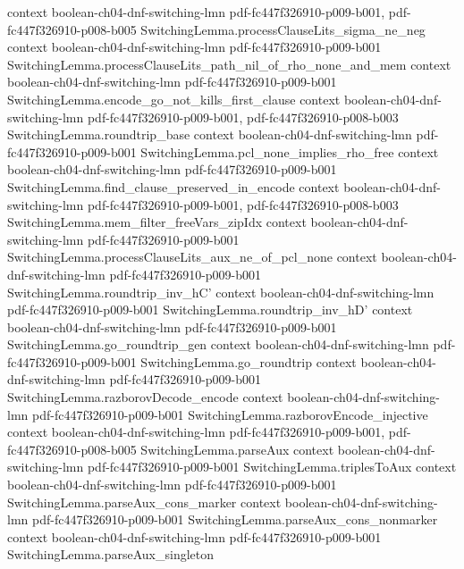 \begin{theorem}
  {context}
  {boolean-ch04-dnf-switching-lmn}
  {pdf-fc447f326910-p009-b001,
    pdf-fc447f326910-p008-b005}
\proofstep
  {SwitchingLemma.processClauseLits_sigma_ne_neg}
  {context}
  {boolean-ch04-dnf-switching-lmn}
  {pdf-fc447f326910-p009-b001}
\proofstep
  {SwitchingLemma.processClauseLits_path_nil_of_rho_none_and_mem}
  {context}
  {boolean-ch04-dnf-switching-lmn}
  {pdf-fc447f326910-p009-b001}
\proofstep
  {SwitchingLemma.encode_go_not_kills_first_clause}
  {context}
  {boolean-ch04-dnf-switching-lmn}
  {pdf-fc447f326910-p009-b001,
    pdf-fc447f326910-p008-b003}
\proofstep
  {SwitchingLemma.roundtrip_base}
  {context}
  {boolean-ch04-dnf-switching-lmn}
  {pdf-fc447f326910-p009-b001}
\proofstep
  {SwitchingLemma.pcl_none_implies_rho_free}
  {context}
  {boolean-ch04-dnf-switching-lmn}
  {pdf-fc447f326910-p009-b001}
\proofstep
  {SwitchingLemma.find_clause_preserved_in_encode}
  {context}
  {boolean-ch04-dnf-switching-lmn}
  {pdf-fc447f326910-p009-b001,
    pdf-fc447f326910-p008-b003}
\proofstep
  {SwitchingLemma.mem_filter_freeVars_zipIdx}
  {context}
  {boolean-ch04-dnf-switching-lmn}
  {pdf-fc447f326910-p009-b001}
\proofstep
  {SwitchingLemma.processClauseLits_aux_ne_of_pcl_none}
  {context}
  {boolean-ch04-dnf-switching-lmn}
  {pdf-fc447f326910-p009-b001}
\proofstep
  {SwitchingLemma.roundtrip_inv_hC'}
  {context}
  {boolean-ch04-dnf-switching-lmn}
  {pdf-fc447f326910-p009-b001}
\proofstep
  {SwitchingLemma.roundtrip_inv_hD'}
  {context}
  {boolean-ch04-dnf-switching-lmn}
  {pdf-fc447f326910-p009-b001}
\proofstep
  {SwitchingLemma.go_roundtrip_gen}
  {context}
  {boolean-ch04-dnf-switching-lmn}
  {pdf-fc447f326910-p009-b001}
\proofstep
  {SwitchingLemma.go_roundtrip}
  {context}
  {boolean-ch04-dnf-switching-lmn}
  {pdf-fc447f326910-p009-b001}
\proofstep
  {SwitchingLemma.razborovDecode_encode}
  {context}
  {boolean-ch04-dnf-switching-lmn}
  {pdf-fc447f326910-p009-b001}
\proofstep
  {SwitchingLemma.razborovEncode_injective}
  {context}
  {boolean-ch04-dnf-switching-lmn}
  {pdf-fc447f326910-p009-b001,
    pdf-fc447f326910-p008-b005}
\proofstep
  {SwitchingLemma.parseAux}
  {context}
  {boolean-ch04-dnf-switching-lmn}
  {pdf-fc447f326910-p009-b001}
\proofstep
  {SwitchingLemma.triplesToAux}
  {context}
  {boolean-ch04-dnf-switching-lmn}
  {pdf-fc447f326910-p009-b001}
\proofstep
  {SwitchingLemma.parseAux_cons_marker}
  {context}
  {boolean-ch04-dnf-switching-lmn}
  {pdf-fc447f326910-p009-b001}
\proofstep
  {SwitchingLemma.parseAux_cons_nonmarker}
  {context}
  {boolean-ch04-dnf-switching-lmn}
  {pdf-fc447f326910-p009-b001}
\proofstep
  {SwitchingLemma.parseAux_singleton}

\end{theorem}
